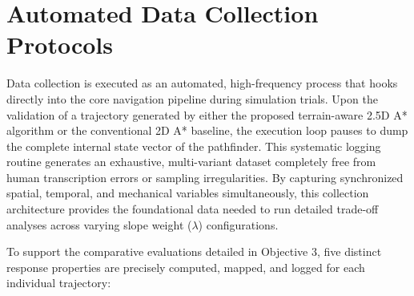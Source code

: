 \section{Automated Data Collection Protocols}

Data collection is executed as an automated, high-frequency process that hooks directly into the
core navigation pipeline during simulation trials. Upon the validation of a trajectory generated by
either the proposed terrain-aware 2.5D A* algorithm or the conventional 2D A* baseline, the
execution loop pauses to dump the complete internal state vector of the pathfinder. This systematic
logging routine generates an exhaustive, multi-variant dataset completely free from human
transcription errors or sampling irregularities. By capturing synchronized spatial, temporal, and
mechanical variables simultaneously, this collection architecture provides the foundational data
needed to run detailed trade-off analyses across varying slope weight ($\lambda$) configurations.

To support the comparative evaluations detailed in Objective 3, five distinct response properties
are precisely computed, mapped, and logged for each individual trajectory:


